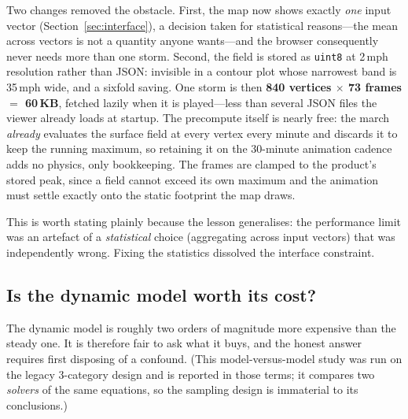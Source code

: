 \documentclass[11pt]{article}
\begin{document}
Two changes removed the obstacle. First, the map now shows exactly \emph{one} input
vector (Section~\ref{sec:interface}), a decision taken for statistical reasons---the
mean across vectors is not a quantity anyone wants---and the browser consequently never
needs more than one storm. Second, the field is stored as \texttt{uint8} at 2\,mph
resolution rather than JSON: invisible in a contour plot whose narrowest band is 35\,mph
wide, and a sixfold saving. One storm is then \textbf{840 vertices $\times$ 73 frames
$=$ 60\,KB}, fetched lazily when it is played---less than several JSON files the viewer
already loads at startup. The precompute itself is nearly free: the march \emph{already}
evaluates the surface field at every vertex every minute and discards it to keep the
running maximum, so retaining it on the 30-minute animation cadence adds no physics, only
bookkeeping. The frames are clamped to the product's stored peak, since a field cannot
exceed its own maximum and the animation must settle exactly onto the static footprint
the map draws.

This is worth stating plainly because the lesson generalises: the performance limit was
an artefact of a \emph{statistical} choice (aggregating across input vectors) that was
independently wrong. Fixing the statistics dissolved the interface constraint.

\subsection{Is the dynamic model worth its cost?}\label{sec:steadyvsdyn}
The dynamic model is roughly two orders of magnitude more expensive than the steady
one. It is therefore fair to ask what it buys, and the honest answer requires first
disposing of a confound. (This model-versus-model study was run on the legacy
3-category design and is reported in those terms; it compares two \emph{solvers} of
the same equations, so the sampling design is immaterial to its conclusions.)
\end{document}
